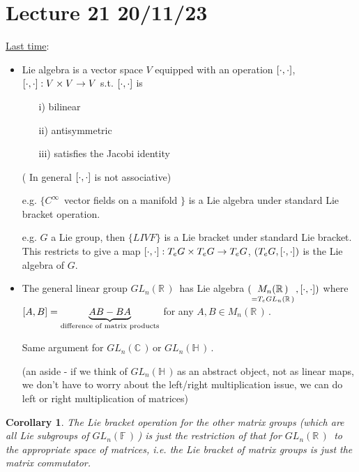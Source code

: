\documentclass[12pt,a4paper]{article}
\newcommand{\rR}{\ensuremath{\mathbb{R}\,}}
\newcommand{\cC}{\ensuremath{\mathbb{C}\,}}
\newcommand{\hH}{\ensuremath{\mathbb{H}\,}}
\newcommand{\fF}{\ensuremath{\mathbb{F}\,}}
\newcommand{\cinf}{\ensuremath{C^{\infty}\,}}
\newcommand{\tqn}[2]{\ensuremath{T_{#1} {#2}}}
\newcommand{\mnr}{\ensuremath{M_n(\rR)\,}}
\newcommand{\glnr}{\ensuremath{GL_n(\rR)\,}}
\newcommand{\glnc}{\ensuremath{GL_n(\cC)\,}}
\newcommand{\glnh}{\ensuremath{GL_n(\hH)\,}}
\newcommand{\glnff}{\ensuremath{GL_n(\fF)\,}}
\newcommand{\ul}[1]{\underline{#1}}
\newcommand{\ecomm}{\ensuremath{\comm{\cdot}{\cdot}}}
\newtheorem{cor}[thm]{Corollary}
\begin{document}
\section{Lecture 21 20/11/23}
\ul{Last time}:
\begin{itemize}
\item Lie algebra is a vector space $V$ equipped with an operation $\comm{\cdot}{\cdot}$, $\comm{\cdot}{\cdot}:V\times V\to V$ s.t. $\comm{\cdot}{\cdot}$ is 
\begin{enumerate}
\item[i)] bilinear
\item[ii)] antisymmetric
\item[iii)] satisfies the Jacobi identity
\end{enumerate}


( In general $\comm{\cdot}{\cdot}$ is not associative) 

e.g. $\{\cinf $ vector fields on a manifold $\}$ is a Lie algebra under standard Lie bracket operation. 

e.g. $G$ a Lie group, then $\{LIVF\}$ is a Lie bracket under standard Lie bracket. This restricts to give a map $\comm{\cdot}{\cdot}:\tqn{e}{G}\times \tqn{e}{G}\to \tqn{e}{G}$, $(\tqn{e}{G}, \comm{\cdot}{\cdot})$ is the Lie algebra of $G$.

\item The general linear group $\glnr$ has Lie algebra $(\underset{=\tqn{e}{\glnr}}{\mnr}, \ecomm)$ where $\comm{A}{B}=\underbrace{AB-BA}_{\text{difference of matrix products}}$ for any $A,B\in \mnr$.

Same argument for \glnc or \glnh.

(an aside - if we think of \glnh as an abstract object, not as linear maps, we don't have to worry about the left/right multiplication issue, we can do left or right multiplication of matrices)
\end{itemize}

\begin{cor}
The Lie bracket operation for the other matrix groups (which are all Lie subgroups of \glnff) is just the restriction of that for $\glnr$ to the appropriate space of matrices, i.e. the Lie bracket of matrix groups is just the matrix commutator.
\end{cor}
\end{document}
